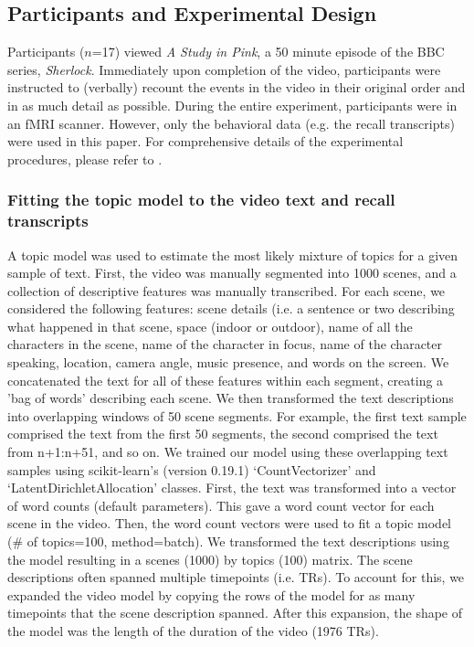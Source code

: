 \documentclass{article}
\begin{document}
{\subsection{Participants and Experimental Design}
Participants ($n$=17) viewed \textit{A Study in Pink}, a 50 minute episode of the BBC series, \textit{Sherlock}. Immediately upon completion of the video, participants were instructed to (verbally) recount the events in the video in their original order and in as much detail as possible. During the entire experiment, participants were in an fMRI scanner.  However, only the behavioral data (e.g. the recall transcripts) were used in this paper. For comprehensive details of the experimental procedures, please refer to \cite{ChenEtal17}.

\subsubsection{Fitting the topic model to the video text and recall transcripts}
A topic model was used to estimate the most likely mixture of topics for a given sample of text. First, the video was manually segmented into 1000 scenes, and a collection of descriptive features was manually transcribed. For each scene, we considered the following features: scene details (i.e. a sentence or two describing what happened in that scene, space (indoor or outdoor), name of all the characters in the scene, name of the character in focus, name of the character speaking, location, camera angle, music presence, and words on the screen. We concatenated the text for all of these features within each segment, creating a 'bag of words' describing each scene. We then transformed the text descriptions into overlapping windows of 50 scene segments. For example, the first text sample comprised the text from the first 50 segments, the second comprised the text from n+1:n+51, and so on. We trained our model using these overlapping text samples using scikit-learn's (version 0.19.1) `CountVectorizer' and `LatentDirichletAllocation' classes.  First, the text was transformed into a vector of word counts (default parameters). This gave a word count vector for each scene in the video.  Then, the word count vectors were used to fit a topic model (\# of topics=100, method=batch). We transformed the text descriptions using the model resulting in a scenes (1000) by topics (100) matrix. The scene descriptions often spanned multiple timepoints (i.e. TRs). To account for this, we expanded the video model by copying the rows of the model for as many timepoints that the scene description spanned. After this expansion, the shape of the model was the length of the duration of the video (1976 TRs).

}
\end{document}
